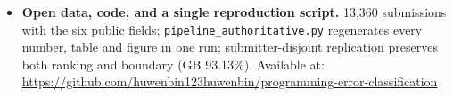\documentclass[11pt]{article}
\begin{document}
\begin{itemize}
\item \textbf{Open data, code, and a single reproduction script.} 13,360 submissions with the six public fields; \texttt{pipeline\_authoritative.py} regenerates every number, table and figure in one run; submitter-disjoint replication preserves both ranking and boundary (GB 93.13\%). Available at: \url{https://github.com/huwenbin123huwenbin/programming-error-classification}
\end{itemize}
\end{document}
